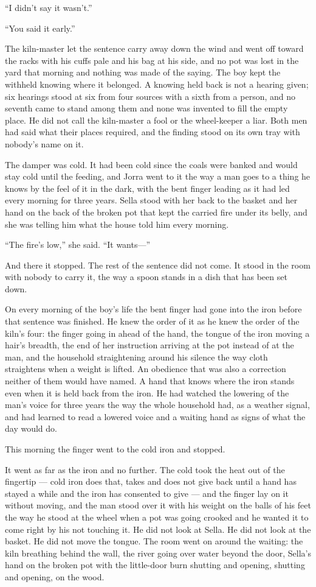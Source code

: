 “I didn't say it wasn't.”

“You said it early.”

The kiln-master let the sentence carry away down the wind and went off toward the racks with his cuffs pale and his bag at his side, and no pot was lost in the yard that morning and nothing was made of the saying. The boy kept the withheld knowing where it belonged. A knowing held back is not a hearing given; six hearings stood at six from four sources with a sixth from a person, and no seventh came to stand among them and none was invented to fill the empty place. He did not call the kiln-master a fool or the wheel-keeper a liar. Both men had said what their places required, and the finding stood on its own tray with nobody's name on it.

\scenebreak

The damper was cold. It had been cold since the coals were banked and would stay cold until the feeding, and Jorra went to it the way a man goes to a thing he knows by the feel of it in the dark, with the bent finger leading as it had led every morning for three years. Sella stood with her back to the basket and her hand on the back of the broken pot that kept the carried fire under its belly, and she was telling him what the house told him every morning.

“The fire's low,” she said. “It wants---”

And there it stopped. The rest of the sentence did not come. It stood in the room with nobody to carry it, the way a spoon stands in a dish that has been set down.

On every morning of the boy's life the bent finger had gone into the iron before that sentence was finished. He knew the order of it as he knew the order of the kiln's four: the finger going in ahead of the hand, the tongue of the iron moving a hair's breadth, the end of her instruction arriving at the pot instead of at the man, and the household straightening around his silence the way cloth straightens when a weight is lifted. An obedience that was also a correction neither of them would have named. A hand that knows where the iron stands even when it is held back from the iron. He had watched the lowering of the man's voice for three years the way the whole household had, as a weather signal, and had learned to read a lowered voice and a waiting hand as signs of what the day would do.

This morning the finger went to the cold iron and stopped.

It went as far as the iron and no further. The cold took the heat out of the fingertip --- cold iron does that, takes and does not give back until a hand has stayed a while and the iron has consented to give --- and the finger lay on it without moving, and the man stood over it with his weight on the balls of his feet the way he stood at the wheel when a pot was going crooked and he wanted it to come right by his not touching it. He did not look at Sella. He did not look at the basket. He did not move the tongue. The room went on around the waiting: the kiln breathing behind the wall, the river going over water beyond the door, Sella's hand on the broken pot with the little-door burn shutting and opening, shutting and opening, on the wood.


